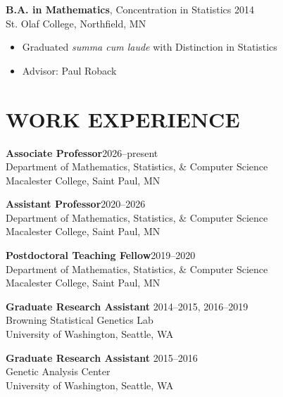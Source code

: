 \documentclass[margin]{res}
\newcommand{\annotateItem}[1]{
	\begin{itemize} \vspace{-0.1cm}
	\item[] 
	\begin{footnotesize}\textcolor{black}{(#1)}\end{footnotesize}
	\end{itemize} \vspace{-0.1cm}
}
\begin{document}
\begin{resume}
					\textbf{B.A. in Mathematics}, Concentration in Statistics  \hfill 2014 \\ %
					St. Olaf College, Northfield, MN \vspace{0.1cm}
					\begin{itemize} \itemsep -2pt
					\item[] Graduated \textit{summa cum laude} with Distinction in Statistics 
					\item[]Advisor: Paul Roback\\
					\end{itemize}
					
\section{WORK EXPERIENCE}

\textbf{Associate Professor}\hfill 2026--present \\
Department of Mathematics, Statistics, \& Computer Science \\
Macalester College, Saint Paul, MN 

\textbf{Assistant Professor}\hfill 2020--2026 \\
Department of Mathematics, Statistics, \& Computer Science \\
Macalester College, Saint Paul, MN %

\textbf{Postdoctoral Teaching Fellow}\hfill 2019--2020 \\
Department of Mathematics, Statistics, \& Computer Science \\
Macalester College, Saint Paul, MN

\textbf{Graduate Research Assistant} \hfill 2014--2015, 2016--2019\\
Browning Statistical Genetics Lab \\
University of Washington, Seattle, WA
	
\textbf{Graduate Research Assistant} \hfill 2015--2016 \\
Genetic Analysis Center \\
University of Washington, Seattle, WA
	

\end{resume}
\end{document}
